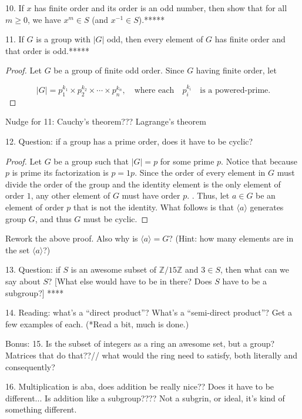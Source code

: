 \documentclass[a4paper,12pt]{article}
\begin{document}
10. If $x$ has finite order and its order is an odd number, then show that for all $m \geq 0$, we have $x^{m} \in S$ (and $x^{-1} \in S$).*****


11. If $G$ is a group with $|G|$ odd, then every element of $G$ has finite order and that order is odd.*****

\begin{proof}
    Let $G$ be a group of finite odd order. Since $G$ having finite order, let 

    \[|G| = p^{k_1}_{1}\times p^{k_2}_{2} \times \cdots \times p^{k_n}_{n}, \quad \text{where each} \quad p^{k_i}_{i} \quad \text{is a powered-prime.}\] 

\end{proof}

Nudge for 11:  Cauchy's theorem???   Lagrange's theorem

12. Question: if a group has a prime order, does it have to be cyclic?
 
\begin{proof}
    Let $G$ be a group such that $|G| = p$ for some prime $p$. Notice that because $p$ is prime its factorization is $p = 1 p$. Since the order of every element in $G$ must divide the order of the group and the identity element is the only element of order $1$, any other element of $G$ must have order $p$. . Thus, let $a \in G$ be an element of order $p$ that is not the identity. What follows is that $\langle a \rangle$ generates group $G$, and thus $G$ must be cyclic.
\end{proof}

Rework the above proof.  Also why is $\langle a \rangle = G$?  (Hint:  how many elements are in the set $\langle a \rangle$?)

13. Question: if $S$ is an awesome subset of $\mathbb{Z}/15\mathbb{Z}$ and $3 \in S$, then what can we say about $S$?  [What else would have to be in there?  Does $S$ have to be a subgroup?] ****



14. Reading: what's a ``direct product''?  What's a ``semi-direct product''?   Get a few examples of each. (*Read a bit, much is done.)


Bonus: 
15. Is the subset of integers as a ring an awesome set, but a group? Matrices that do that??// what would the ring need to satisfy, both literally and consequently?
 
16. Multiplication is aba, does addition be really nice?? Does it have to be different... Is addition like a subgroup???? Not a subgrin, or ideal, it's kind of something different.
\end{document}
